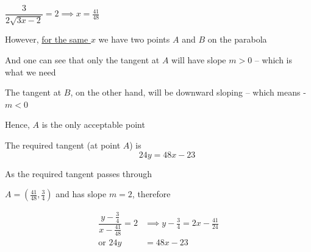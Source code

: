 \documentclass[14pt,fleqn]{extarticle}
\begin{document}
$\dfrac{3}{2\sqrt{3x-2}} = 2 \implies x = \frac{41}{48}$ \newline 

However, \underline{for the same $x$} we have two points $A$ and $B$ on the parabola \newline 

And one can see that only the tangent at $A$ will have slope $m > 0$ -- which is what we need \newline 

The tangent at $B$, on the other hand, will be downward sloping -- which means - $m < 0$ \newline 

Hence, $A$ is the only acceptable point


\newcard

The required tangent (at point $A$) is 
\[ \qquad 24y = 48x - 23 \] 


\newcard

As the required tangent passes through 

$A = \left(\frac{41}{48},\frac{3}{4} \right)$ and has slope $m = 2$, therefore

\begin{align}
\dfrac{y-\frac{3}{4}}{x-\frac{41}{48}} = 2 &\implies y-\frac{3}{4} = 2x-\frac{41}{24} \\
\text{or } 24y &= 48x - 23 
\end{align}
\end{document}
